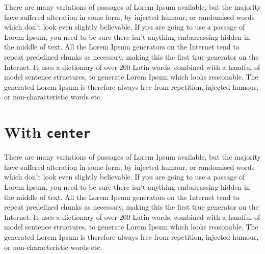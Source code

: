 \documentclass{ximera}
\begin{document}
There are many variations of passages of Lorem Ipsum available, but
the majority have suffered alteration in some form, by injected
humour, or randomised words which don't look even slightly
believable. If you are going to use a passage of Lorem Ipsum, you need
to be sure there isn't anything embarrassing hidden in the middle of
text. All the Lorem Ipsum generators on the Internet tend to repeat
predefined chunks as necessary, making this the first true generator
on the Internet. It uses a dictionary of over 200 Latin words,
combined with a handful of model sentence structures, to generate
Lorem Ipsum which looks reasonable. The generated Lorem Ipsum is
therefore always free from repetition, injected humour, or
non-characteristic words etc.



\begin{image}
\end{image}



\section{With \texttt{center}}


There are many variations of passages of Lorem Ipsum available, but
the majority have suffered alteration in some form, by injected
humour, or randomised words which don't look even slightly
believable. If you are going to use a passage of Lorem Ipsum, you need
to be sure there isn't anything embarrassing hidden in the middle of
text. All the Lorem Ipsum generators on the Internet tend to repeat
predefined chunks as necessary, making this the first true generator
on the Internet. It uses a dictionary of over 200 Latin words,
combined with a handful of model sentence structures, to generate
Lorem Ipsum which looks reasonable. The generated Lorem Ipsum is
therefore always free from repetition, injected humour, or
non-characteristic words etc.
\end{document}
